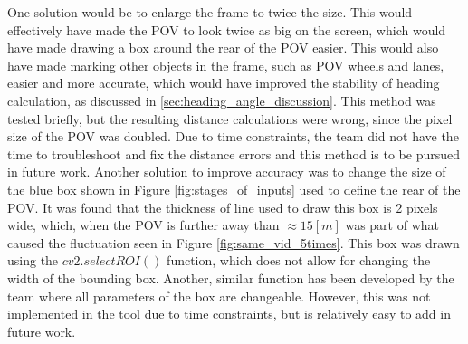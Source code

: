 One solution would be to enlarge the frame to twice the size. This would effectively have made the POV to look twice as big on the screen, which would have made drawing a box around the rear of the POV easier. This would also have made marking other objects in the frame, such as POV wheels and lanes, easier and more accurate, which would have improved the stability of heading calculation, as discussed in \ref{sec:heading_angle_discussion}. This method was tested briefly, but the resulting distance calculations were wrong, since the pixel size of the POV was doubled. Due to time constraints, the team did not have the time to troubleshoot and fix the distance errors and this method is to be pursued in future work. 
Another solution to improve accuracy was to change the size of the blue box shown in Figure \ref{fig:stages_of_inputs} used to define the rear of the POV. It was found that the thickness of line used to draw this box is 2 pixels wide, which, when the POV is further away than $\approx 15[m]$ was part of what caused the fluctuation seen in Figure \ref{fig:same_vid_5times}. This box was drawn using the $cv2.selectROI()$ function, which does not allow for changing the width of the bounding box. Another, similar function has been developed by the team where all parameters of the box are changeable. However, this was not implemented in the tool due to time constraints, but is relatively easy to add in future work.
